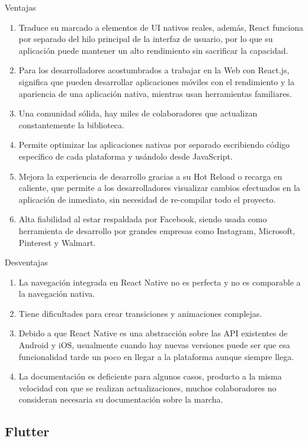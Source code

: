 Ventajas
\begin{enumerate}

\item	Traduce su marcado a elementos de UI nativos reales, además, React funciona por separado del hilo principal de la interfaz de usuario, por lo que su aplicación puede mantener un alto rendimiento sin sacrificar la capacidad.
\item	Para los desarrolladores acostumbrados a trabajar en la Web con React.js, significa que pueden desarrollar aplicaciones móviles con el rendimiento y la apariencia de una aplicación nativa, mientras usan herramientas familiares.
\item	Una comunidad sólida, hay miles de colaboradores que actualizan constantemente la biblioteca.
\item	Permite optimizar las aplicaciones nativas por separado escribiendo código específico de cada plataforma y usándolo desde JavaScript.
\item	Mejora la experiencia de desarrollo gracias a su Hot Reload o recarga en caliente, que permite a los desarrolladores visualizar cambios efectuados en la aplicación de inmediato, sin necesidad de re-compilar todo el proyecto.
\item	Alta fiabilidad al estar respaldada por Facebook, siendo usada como herramienta de desarrollo por grandes empresas como Instagram, Microsoft, Pinterest y Walmart.
\end{enumerate}

Desventajas
\begin{enumerate}



\item	La navegación integrada en React Native no es perfecta y no es comparable a la navegación nativa.
\item	Tiene dificultades para crear transiciones y animaciones complejas.
\item	Debido a que React Native es una abstracción sobre las API existentes de Android y iOS, usualmente cuando hay nuevas versiones puede ser que esa funcionalidad tarde un poco en llegar a la plataforma aunque siempre llega.
\item La documentación es deficiente para algunos casos, producto a la misma velocidad con que se realizan actualizaciones, muchos colaboradores no consideran necesaria su documentación sobre la marcha.
\end{enumerate}

\subsection{Flutter}\label{chapter:introduction}


